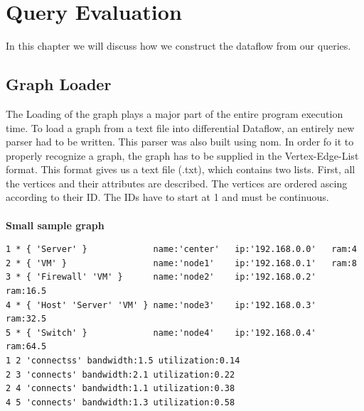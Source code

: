 \documentclass[11pt,singlecolumn]{scrartcl}
\begin{document}

\section{Query Evaluation}
In this chapter we will discuss how we construct the dataflow from our queries.
\subsection{Graph Loader}
The Loading of the graph plays a major part of the entire program execution time. To load a graph from a text file into differential Dataflow, an entirely new parser had to be written. This parser was also built using nom. In order fo it to properly recognize a graph, the graph has to be supplied in the Vertex-Edge-List format\cite{EdgeList}. This format gives us a text file (.txt), which contains two lists. First, all the vertices and their attributes are described. The vertices are ordered ascing according to their ID. The IDs have to start at 1 and must be continuous.\\\\
\textbf{Small sample graph}
\begin{lstlisting}
1 * { 'Server' }             name:'center'   ip:'192.168.0.0'   ram:4
2 * { 'VM' }                 name:'node1'    ip:'192.168.0.1'   ram:8
3 * { 'Firewall' 'VM' }      name:'node2'    ip:'192.168.0.2'   ram:16.5
4 * { 'Host' 'Server' 'VM' } name:'node3'    ip:'192.168.0.3'   ram:32.5
5 * { 'Switch' }             name:'node4'    ip:'192.168.0.4'   ram:64.5
1 2 'connectss' bandwidth:1.5 utilization:0.14
2 3 'connects' bandwidth:2.1 utilization:0.22
2 4 'connects' bandwidth:1.1 utilization:0.38
4 5 'connects' bandwidth:1.3 utilization:0.58
\end{lstlisting}
\end{document}
